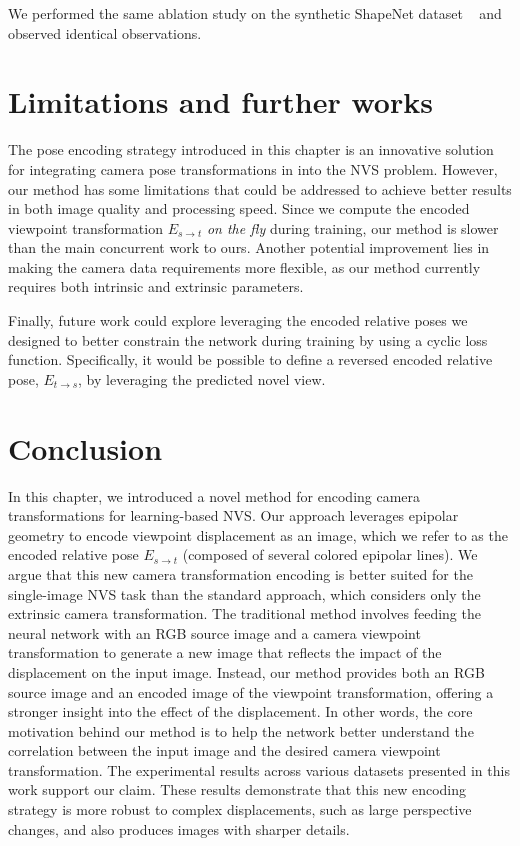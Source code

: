 We performed the same ablation study on the synthetic ShapeNet dataset ~\cite{chang2015shapenet} and observed identical observations.

\section{Limitations and further works}
The pose encoding strategy introduced in this chapter is an innovative solution for integrating camera pose transformations in into the \ac{NVS} problem. However, our method has some limitations that could be addressed to achieve better results in both image quality and processing speed. Since we compute the encoded viewpoint transformation $E_{s\xrightarrow{}t}$ \textit{on the fly} during training, our method is slower than the main concurrent work \citep{kim2020novel} to ours. Another potential improvement lies in making the camera data requirements more flexible, as our method currently requires both intrinsic and extrinsic parameters. 

Finally, future work could explore leveraging the encoded relative poses we designed to better constrain the network during training by using a cyclic loss function. Specifically, it would be possible to define a reversed encoded relative pose, $E_{t\xrightarrow{}s}$, by leveraging the predicted novel view. 

\section{Conclusion}
In this chapter, we introduced a novel method for encoding camera transformations for learning-based \ac{NVS}. Our approach leverages epipolar geometry to encode viewpoint displacement as an image, which we refer to as the encoded relative pose $E_{s\xrightarrow{}t}$ (composed of several colored epipolar lines). We argue that this new camera transformation encoding is better suited for the single-image \ac{NVS} task than the standard approach, which considers only the extrinsic camera transformation. The traditional method involves feeding the neural network with an RGB source image and a camera viewpoint transformation to generate a new image that reflects the impact of the displacement on the input image. Instead, our method provides both an RGB source image and an encoded image of the viewpoint transformation, offering a stronger insight into the effect of the displacement. In other words, the core motivation behind our method is to help the network better understand the correlation between the input image and the desired camera viewpoint transformation. The experimental results across various datasets presented in this work support our claim. These results demonstrate that this new encoding strategy is more robust to complex displacements, such as large perspective changes, and also produces images with sharper details.
